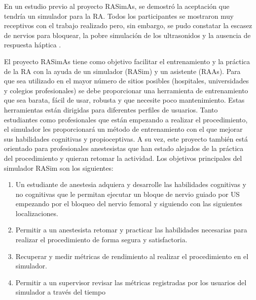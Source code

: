 En un estudio previo al proyecto \ac{RASimAs}, se demostró la aceptación que tendría un simulador para la \ac{RA}. Todos los participantes se mostraron muy receptivos con el trabajo realizado pero, sin embargo, se pudo constatar la escasez de nervios para bloquear, la pobre simulación de los ultrasonidos y la ausencia de respuesta háptica \cite{Grottke2009594}.





El proyecto \ac{RASimAs} tiene como objetivo  facilitar el entrenamiento y la práctica de la \ac{RA} con la ayuda de un simulador (\ac{RASim}) y un asistente (\ac{RAAs}).
Para que sea utilizado en el mayor número de sitios posibles (hospitales, universidades y colegios profesionales) se debe proporcionar una herramienta de entrenamiento que sea barata, fácil de usar, robusta y que necesite poco mantenimiento.
Estas herramientas están dirigidas para diferentes perfiles de usuarios.  Tanto estudiantes como profesionales que están empezando a realizar el procedimiento, el simulador les proporcionará un método de entrenamiento con el que mejorar sus habilidades cognitivas y propioceptivas. A su vez, este proyecto también está orientado para profesionales anestesistas que han estado alejados de la práctica del procedimiento y quieran retomar la actividad.
Los objetivos principales del simulador \ac{RASim} son los siguientes:
\begin{enumerate}
    \item Un estudiante de anestesia adquiera y desarrolle las habilidades cognitivas y no cognitivas que le permitan ejecutar un bloque de nervio guiado por \ac{US} empezando por el bloqueo del nervio femoral y siguiendo con las siguientes localizaciones.
    \item Permitir a un anestesista retomar y practicar las habilidades necesarias para realizar el procedimiento de forma segura y satisfactoria.
    \item Recuperar y medir métricas de rendimiento al realizar el procedimiento en el simulador. 
    \item Permitir a un supervisor revisar las métricas registradas por los usuarios del simulador a través del tiempo
\end{enumerate}









